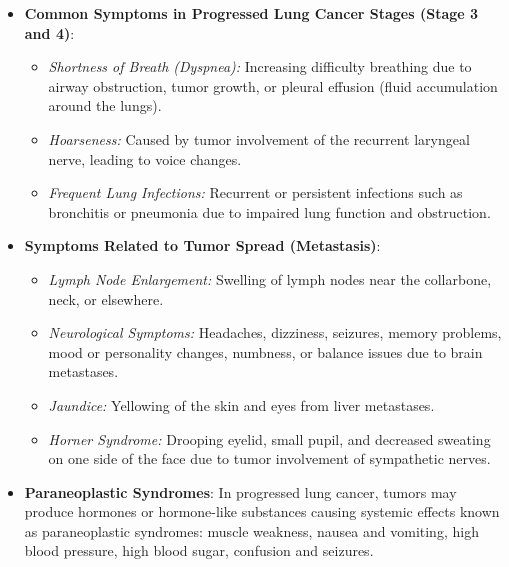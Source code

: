 \newpage
\begin{itemize}
    \item \textbf{Common Symptoms in Progressed Lung Cancer Stages (Stage 3 and 4)}:
        \begin{itemize}
            \item \textit{Shortness of Breath (Dyspnea):} Increasing difficulty breathing due to 
            airway obstruction, tumor growth, or pleural effusion (fluid accumulation around the 
            lungs).

            \item \textit{Hoarseness:} Caused by tumor involvement of the recurrent laryngeal nerve, 
            leading to voice changes.

            \item \textit{Frequent Lung Infections:} Recurrent or persistent infections such as 
            bronchitis or pneumonia due to impaired lung function and obstruction.
        \end{itemize}
    
    \item \textbf{Symptoms Related to Tumor Spread (Metastasis)}:
        \begin{itemize}
            \item \textit{Lymph Node Enlargement:} Swelling of lymph nodes near the collarbone, 
            neck, or elsewhere.

            \item \textit{Neurological Symptoms:} Headaches, dizziness, seizures, memory problems, 
            mood or personality changes, numbness, or balance issues due to brain metastases.

            \item \textit{Jaundice:} Yellowing of the skin and eyes from liver metastases.

            \item \textit{Horner Syndrome:} Drooping eyelid, small pupil, and decreased sweating on 
            one side of the face due to tumor involvement of sympathetic nerves.
        \end{itemize}
    
    \item \textbf{Paraneoplastic Syndromes}:
    In progressed lung cancer, tumors may produce hormones or hormone-like substances causing 
    systemic effects known as paraneoplastic syndromes: muscle weakness, nausea and vomiting, high 
    blood pressure, high blood sugar, confusion and seizures.  
\end{itemize}
